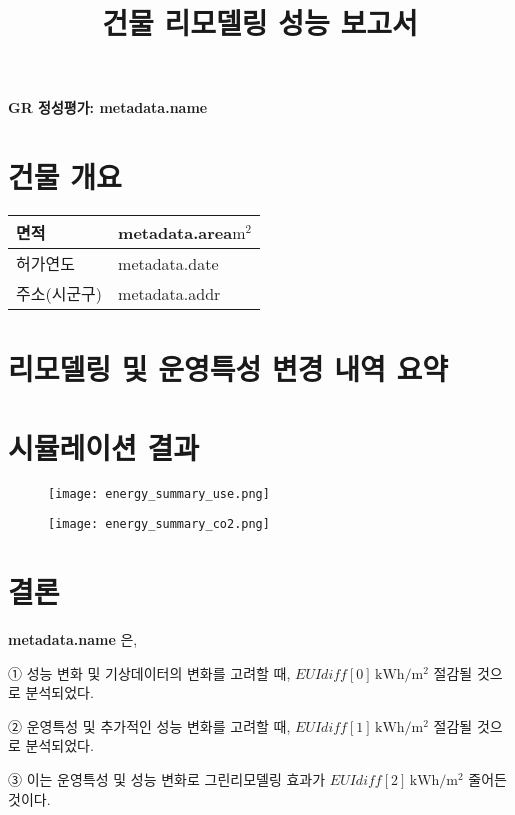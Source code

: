 \documentclass[a4paper,10pt]{article}
\title{건물 리모델링 성능 보고서}
\begin{document}
\begin{center}
    \Large\bfseries GR 정성평가: {{metadata.name}}
\end{center}


\section{건물 개요}


\setlength{\tabcolsep}{0pt}
\renewcommand{\arraystretch}{1.3}

\begin{table}[h!]
\centering
\begin{tabular}{L|C}
\hline
면적 & {{metadata.area}}$\mathrm{m^2}$ \\ \hline
허가연도 & {{metadata.date}} \\ \hline
주소(시군구) & {{metadata.addr}} \\ \hline
\end{tabular}
\end{table}

\section{리모델링 및 운영특성 변경 내역 요약}

\section{시뮬레이션 결과}
\begin{figure}[h!]
    \centering
    \begin{minipage}[b]{0.49\textwidth}
        \texttt{[image: energy\_summary\_use.png]}
    \end{minipage}
    \hfill
    \begin{minipage}[b]{0.49\textwidth}
        \texttt{[image: energy\_summary\_co2.png]}
    \end{minipage}
\end{figure}


\section{결론}
\begin{tcolorbox}[colback=gray!5,colframe=black!60,boxrule=0.6pt,
                  left=4mm,right=4mm,top=2mm,bottom=2mm]
\textbf{ {{metadata.name}} }은,

① 성능 변화 및 기상데이터의 변화를 고려할 때, \underline{${{EUIdiff[0]}}\,\mathrm{kWh/m^2}$} 절감될 것으로 분석되었다.

② 운영특성 및 추가적인 성능 변화를 고려할 때, 
\underline{${{EUIdiff[1]}}\,\mathrm{kWh/m^2}$} 절감될 것으로 분석되었다. 

③ 이는 운영특성 및 성능 변화로 그린리모델링 효과가 
\underline{${{EUIdiff[2]}}\,\mathrm{kWh/m^2}$} 줄어든 것이다.
\end{tcolorbox}
\end{document}

